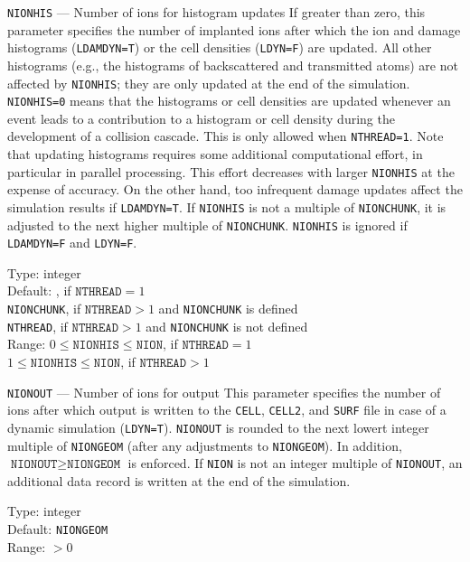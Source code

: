 \begin{keydescription}{\texttt{NIONHIS} --- Number of ions for histogram updates}
%
  If greater than zero, this parameter specifies the number of implanted ions
  after which the ion and damage histograms (\texttt{LDAMDYN=T}) or the cell
  densities (\texttt{LDYN=F}) are updated. All other histograms (e.g., the 
  histograms of backscattered and transmitted atoms) are not affected
  by \texttt{NIONHIS}; they are only updated at the end of the simulation. 
  \texttt{NIONHIS=0} means that the histograms or cell densities are 
  updated whenever an event leads to a contribution to a histogram or cell
  density during the development of a collision cascade. This is only
  allowed when \texttt{NTHREAD=1}. Note that updating histograms requires some
  additional computational effort, in particular in parallel processing. This 
  effort decreases with larger \texttt{NIONHIS} at the expense of accuracy. On
  the other hand, too infrequent damage updates affect the simulation results
  if \texttt{LDAMDYN=T}. If \texttt{NIONHIS} is not a multiple of
  \texttt{NIONCHUNK}, it is adjusted to the next higher multiple of
  \texttt{NIONCHUNK}. \texttt{NIONHIS} is ignored if \texttt{LDAMDYN=F} and
  \texttt{LDYN=F}.
  \begin{keytab}
    Type:    \> integer \\
    Default: , if $\texttt{NTHREAD} = 1$ \\
             \> \texttt{NIONCHUNK}, if $\texttt{NTHREAD} > 1$ and
                \texttt{NIONCHUNK} is defined \\
             \> \texttt{NTHREAD}, if $\texttt{NTHREAD} > 1$ and
                \texttt{NIONCHUNK} is not defined \\
    Range:   \> $0 \le \texttt{NIONHIS} \le \texttt{NION}$, if
                $\texttt{NTHREAD} = 1$ \\
             \> $1 \le \texttt{NIONHIS} \le \texttt{NION}$, if 
                $\texttt{NTHREAD} > 1$
  \end{keytab}
\end{keydescription}

\begin{keydescription}{\texttt{NIONOUT} --- Number of ions for output}
%
  This parameter specifies the number of ions after which output is 
  written to the \texttt{CELL}, \texttt{CELL2}, and \texttt{SURF} file
  in case of a dynamic simulation (\texttt{LDYN=T}). \texttt{NIONOUT} is
  rounded to the next lowert integer multiple of \texttt{NIONGEOM} (after
  any adjustments to \texttt{NIONGEOM}). In addition, $\texttt{NIONOUT}
  \ge \texttt{NIONGEOM}$ is enforced. If \texttt{NION} is not an 
  integer multiple of \texttt{NIONOUT}, an additional data record is 
  written at the end of the simulation.
  \begin{keytab}
    Type:    \> integer \\
    Default: \> \texttt{NIONGEOM} \\
    Range:   \> $> 0$
  \end{keytab}
\end{keydescription}

